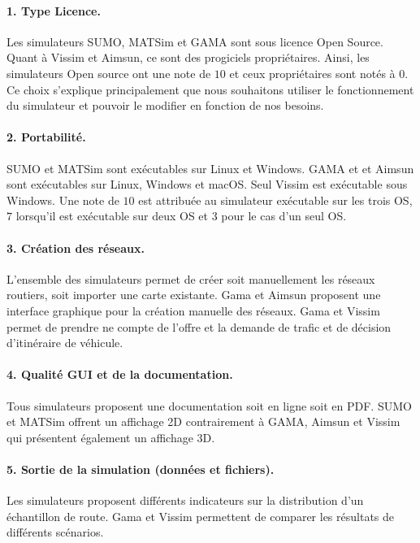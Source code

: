 \paragraph{1. Type Licence.}

Les simulateurs SUMO, MATSim et GAMA sont sous licence Open Source. Quant à Vissim et Aimsun, ce sont des progiciels propriétaires. Ainsi, les simulateurs Open source ont une note de $10$ et ceux propriétaires sont notés à $0$. Ce choix s'explique principalement que nous souhaitons utiliser le fonctionnement du simulateur et pouvoir le modifier en fonction de nos besoins.

\paragraph{2. Portabilité.}

SUMO et MATSim sont exécutables sur Linux et Windows. GAMA et et Aimsun sont exécutables sur Linux, Windows et macOS. Seul Vissim est exécutable sous Windows. Une note de $10$ est attribuée au simulateur exécutable sur les trois OS, $7$ lorsqu'il est exécutable sur deux OS et $3$ pour le cas d'un seul OS.

\paragraph{3. Création des réseaux.}

L'ensemble des simulateurs permet de créer soit manuellement les réseaux routiers, soit importer une carte existante. Gama et Aimsun proposent une interface graphique pour la création manuelle des réseaux. Gama et Vissim permet de prendre ne compte de l'offre et la demande de trafic et de décision d'itinéraire de véhicule.

\paragraph{4. Qualité GUI et de la documentation.}

Tous simulateurs proposent une documentation soit en ligne soit en PDF. SUMO et MATSim offrent un affichage 2D contrairement à GAMA, Aimsun et Vissim qui présentent également un affichage 3D.

\paragraph{5. Sortie de la simulation (données et fichiers).} 

Les simulateurs proposent différents indicateurs sur la distribution d'un échantillon de route. Gama et Vissim permettent de comparer les résultats de différents scénarios. 

